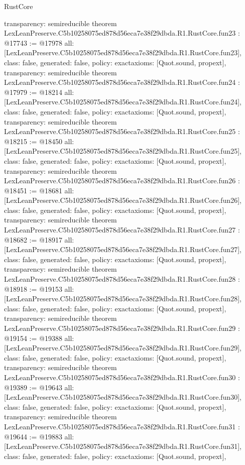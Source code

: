 \begin{lexlean}{RustCore}
\begin{coremodule}
{  transparency: semireducible
}
theorem LexLeanPreserve.C5b10258075ed878d56eca7e38f29dbda.R1.RustCore.fun23 : @17743 := @17978 {
  all: [LexLeanPreserve.C5b10258075ed878d56eca7e38f29dbda.R1.RustCore.fun23],
  class: false,
  generated: false,
  policy: exact{axioms: [Quot.sound, propext]},
  transparency: semireducible
}
theorem LexLeanPreserve.C5b10258075ed878d56eca7e38f29dbda.R1.RustCore.fun24 : @17979 := @18214 {
  all: [LexLeanPreserve.C5b10258075ed878d56eca7e38f29dbda.R1.RustCore.fun24],
  class: false,
  generated: false,
  policy: exact{axioms: [Quot.sound, propext]},
  transparency: semireducible
}
theorem LexLeanPreserve.C5b10258075ed878d56eca7e38f29dbda.R1.RustCore.fun25 : @18215 := @18450 {
  all: [LexLeanPreserve.C5b10258075ed878d56eca7e38f29dbda.R1.RustCore.fun25],
  class: false,
  generated: false,
  policy: exact{axioms: [Quot.sound, propext]},
  transparency: semireducible
}
theorem LexLeanPreserve.C5b10258075ed878d56eca7e38f29dbda.R1.RustCore.fun26 : @18451 := @18681 {
  all: [LexLeanPreserve.C5b10258075ed878d56eca7e38f29dbda.R1.RustCore.fun26],
  class: false,
  generated: false,
  policy: exact{axioms: [Quot.sound, propext]},
  transparency: semireducible
}
theorem LexLeanPreserve.C5b10258075ed878d56eca7e38f29dbda.R1.RustCore.fun27 : @18682 := @18917 {
  all: [LexLeanPreserve.C5b10258075ed878d56eca7e38f29dbda.R1.RustCore.fun27],
  class: false,
  generated: false,
  policy: exact{axioms: [Quot.sound, propext]},
  transparency: semireducible
}
theorem LexLeanPreserve.C5b10258075ed878d56eca7e38f29dbda.R1.RustCore.fun28 : @18918 := @19153 {
  all: [LexLeanPreserve.C5b10258075ed878d56eca7e38f29dbda.R1.RustCore.fun28],
  class: false,
  generated: false,
  policy: exact{axioms: [Quot.sound, propext]},
  transparency: semireducible
}
theorem LexLeanPreserve.C5b10258075ed878d56eca7e38f29dbda.R1.RustCore.fun29 : @19154 := @19388 {
  all: [LexLeanPreserve.C5b10258075ed878d56eca7e38f29dbda.R1.RustCore.fun29],
  class: false,
  generated: false,
  policy: exact{axioms: [Quot.sound, propext]},
  transparency: semireducible
}
theorem LexLeanPreserve.C5b10258075ed878d56eca7e38f29dbda.R1.RustCore.fun30 : @19389 := @19643 {
  all: [LexLeanPreserve.C5b10258075ed878d56eca7e38f29dbda.R1.RustCore.fun30],
  class: false,
  generated: false,
  policy: exact{axioms: [Quot.sound, propext]},
  transparency: semireducible
}
theorem LexLeanPreserve.C5b10258075ed878d56eca7e38f29dbda.R1.RustCore.fun31 : @19644 := @19883 {
  all: [LexLeanPreserve.C5b10258075ed878d56eca7e38f29dbda.R1.RustCore.fun31],
  class: false,
  generated: false,
  policy: exact{axioms: [Quot.sound, propext]},
}
\end{coremodule}
\end{lexlean}
